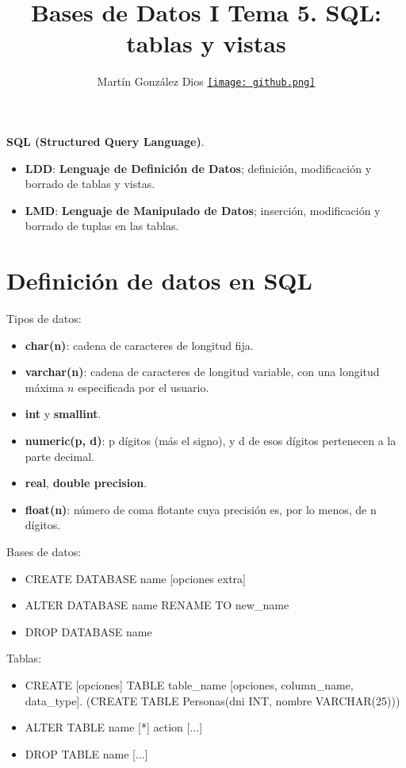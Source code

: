 \documentclass{article}
\title{Bases de Datos I Tema 5. SQL: tablas y vistas}
\author{Martín González Dios 
\href{https://github.com/martindios}{\texttt{[image: github.png]}}}
\begin{document}
\maketitle
\textbf{SQL (Structured Query Language)}.
\begin{itemize}
    \item \textbf{LDD}: \textbf{Lenguaje de Definición de Datos}; definición, modificación y borrado de tablas y vistas.

    \item \textbf{LMD}: \textbf{Lenguaje de Manipulado de Datos}; inserción, modificación y borrado de tuplas en las tablas.
\end{itemize}

\section{Definición de datos en SQL}
Tipos de datos:
\begin{itemize}
    \item \textbf{char(n)}: cadena de caracteres de longitud fija.
    
    \item \textbf{varchar(n)}: cadena de caracteres de longitud variable, con una longitud máxima $n$ especificada por el usuario.

    \item \textbf{int} y \textbf{smallint}.

    \item \textbf{numeric(p, d)}: p dígitos (más el signo), y d de esos dígitos pertenecen a la parte decimal.

    \item \textbf{real}, \textbf{double precision}.

    \item \textbf{float(n)}: número de coma flotante cuya precisión es, por lo menos, de n dígitos. 
\end{itemize}

Bases de datos:
\begin{itemize}
    \item CREATE DATABASE name [opciones extra]
    
    \item ALTER DATABASE name RENAME TO new\_name
    
    \item DROP DATABASE name
\end{itemize}

Tablas:
\begin{itemize}
    \item CREATE [opciones] TABLE table\_name [opciones, column\_name, data\_type]. (CREATE TABLE Personas(dni INT, nombre VARCHAR(25)))
    
    \item ALTER TABLE name [*] action [...] 

    \item DROP TABLE name [...]
\end{itemize}
\end{document}
